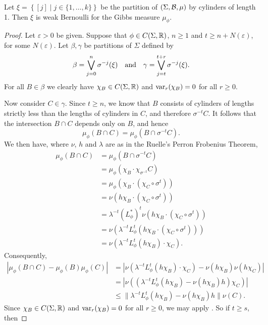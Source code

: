\begin{theorem}\label{thm:gibbs-is-weak-bernoulli}
	Let $\xi = \left\{[j] \mid j \in \{1, \dots, k\}\right\}$ be the partition of $(\Sigma, \mathcal{B}, \mu)$ by cylinders of length 1. Then $\xi$ is weak Bernoulli for the Gibbs measure $\mu_\phi$.
	\begin{proof}
		Let $\varepsilon > 0$ be given. Suppose that $\phi \in C(\Sigma, \mathbb{R})$, $n \geq 1$ and $t \geq n + N(\varepsilon)$, for some $N(\varepsilon)$. Let $\beta, \gamma$ be partitions of $\Sigma$ defined by
		\[
		\beta = \bigvee_{j = 0}^n{\sigma^{-j}(\xi)} \quad \text{and} \quad \gamma = \bigvee_{j = t}^{t + r}{\sigma^{-j}(\xi)}.
		\]
		For all $B \in \beta$ we clearly have $\chi_B \in C(\Sigma, \mathbb{R})$ and $\operatorname{var}_r(\chi_B) = 0$ for all $r \geq 0$.
		
		Now consider $C \in \gamma$. Since $t \geq n$, we know that $B$ consists of cylinders of lengths strictly less than the lengths of cylinders in $C$, and therefore $\sigma^{-t}C$. It follows that the intersection $B \cap C$ depends only on $B$, and hence
		\[
			\mu_\phi(B \cap C) = \mu_\phi(B \cap \sigma^{-t}{C}).
		\]
		We then have, where $\nu$, $h$ and $\lambda$ are as in the Ruelle's Perron Frobenius Theorem,
		\begin{align*}
			\mu_\phi(B \cap C) &= \mu_\phi(B \cap \sigma^{-t}C) \\
				&= \mu_\phi(\chi_B \cdot \chi_{\sigma^{-t}}{C}) \\
				&= \mu_\phi(\chi_B \cdot (\chi_{C} \circ \sigma^t)) \\
				&= \nu(h \chi_B \cdot (\chi_C \circ \sigma^t)) \\
				&= \lambda^{-t}(L_\phi^*)^t\nu(h\chi_B \cdot (\chi_C \circ \sigma^t)) \\
				&= \nu(\lambda^{-t} L_\phi^t(h \chi_B \cdot (\chi_C \circ \sigma^t))) \\
				&= \nu(\lambda^{-t} L_\phi^t(h \chi_B) \cdot \chi_C).
		\end{align*}
		Consequently,
		\begin{align*}
			|\mu_\phi(B \cap C) - \mu_\phi(B)\mu_\phi(C)| &= |\nu(\lambda^{-t} L_\phi^t(h \chi_B) \cdot \chi_C) - \nu(h \chi_B)\nu(h \chi_C)| \\
				&= |\nu((\lambda^{-t} L_\phi^t(h \chi_B) - \nu(h \chi_B)h)\chi_C)| \\
				&\leq \|\lambda^{-t} L_\phi^t(h \chi_B) - \nu(h \chi_B)h\| \nu(C).
		\end{align*}
		Since $\chi_B \in C(\Sigma, \mathbb{R})$ and $\operatorname{var}_r(\chi_B) = 0$ for all $r \geq 0$, we may apply . So if $t \geq s$, then

\end{proof}
\end{theorem}
